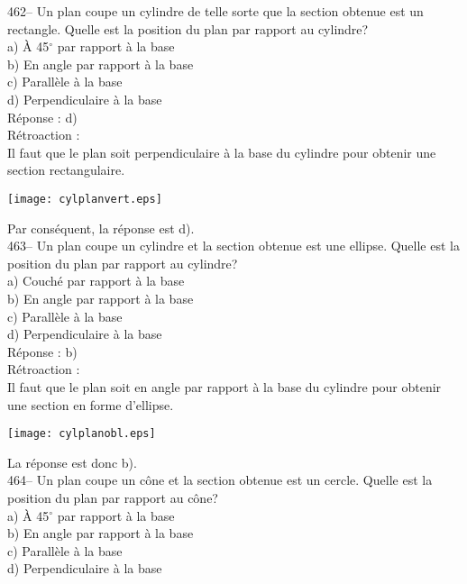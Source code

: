 ﻿\documentclass[letterpaper, 12pt]{article}
\begin{document}
462-- Un plan coupe un cylindre de telle sorte que la section obtenue est un
rectangle.  Quelle est la position du plan par rapport au cylindre?\\
a) \`A 45$^{\circ}$ par rapport \`a la base\\
b) En angle par rapport \`a la base\\
c) Parall\`ele \`a la base\\
d) Perpendiculaire \`a la base\\

R\'eponse : d)\\

R\'etroaction : \\
Il faut que le plan soit perpendiculaire \`a la base du cylindre
pour obtenir une section rectangulaire.
    \begin{center}
    \texttt{[image: cylplanvert.eps]}
    \end{center}

Par cons\'equent, la r\'eponse est d).\\

463-- Un plan coupe un cylindre et la section obtenue est une ellipse.
Quelle est la position du plan par rapport au cylindre?\\
a) Couch\'e par rapport \`a la base\\
b) En angle par rapport \`a la base\\
c) Parall\`ele \`a la base\\
d) Perpendiculaire \`a la base\\

R\'eponse : b)\\

R\'etroaction : \\
Il faut que le plan soit en angle par rapport \`a la base du
cylindre pour obtenir une section en forme d'ellipse.
    \begin{center}
    \texttt{[image: cylplanobl.eps]}
    \end{center}

La r\'eponse est donc b).\\


464-- Un plan coupe un c\^one et la section obtenue est un cercle.  Quelle
est la position du plan par rapport au c\^one?\\
a) \`A 45$^{\circ}$ par rapport \`a la base\\
b) En angle par rapport \`a la base\\
c) Parall\`ele \`a la base\\
d) Perpendiculaire \`a la base\\
\end{document}
